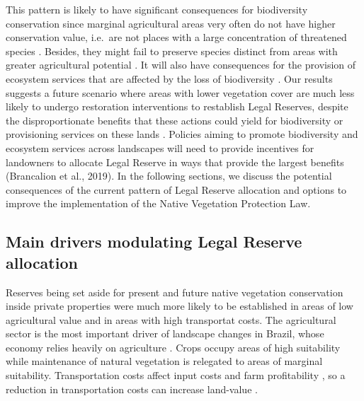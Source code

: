 \documentclass[
	12pt,				%
	oneside,			%
	a4paper,			%
	chapter=TITLE,		%
	section=TITLE,		%
	brazil,			%
	english				%
	]{abntex2}
\begin{document}
This pattern is likely to have significant consequences for biodiversity conservation since marginal agricultural areas very often do not have higher conservation value, i.e.~are not places with a large concentration of threatened species \autocite{venter_bias_2018}. Besides, they might fail to preserve species distinct from areas with greater agricultural potential \autocite{rouget_current_2003}. It will also have consequences for the provision of ecosystem services that are affected by the loss of biodiversity \autocite{tscharntke_landscape_2012}. Our results suggests a future scenario where areas with lower vegetation cover are much less likely to undergo restoration interventions to restablish Legal Reserves, despite the disproportionate benefits that these actions could yield for biodiversity or provisioning services on these lands \autocite{dainese_global_2019}. Policies aiming to promote biodiversity and ecosystem services across landscapes will need to provide incentives for landowners to allocate Legal Reserve in ways that provide the largest benefits (Brancalion et al., 2019). In the following sections, we discuss the potential consequences of the current pattern of Legal Reserve allocation and options to improve the implementation of the Native Vegetation Protection Law.

\hypertarget{main-drivers-modulating-legal-reserve-allocation}{%
\subsection{Main drivers modulating Legal Reserve allocation}\label{main-drivers-modulating-legal-reserve-allocation}}

Reserves being set aside for present and future native vegetation conservation inside private properties were much more likely to be established in areas of low agricultural value and in areas with high transportat costs. The agricultural sector is the most important driver of landscape changes in Brazil, whose economy relies heavily on agriculture \autocite{calaboni_forest_2018,martinelli_agriculture_2010}. Crops occupy areas of high suitability while maintenance of natural vegetation is relegated to areas of marginal suitability. Transportation costs affect input costs and farm profitability \autocite{fliehr_impacts_2019,tamm_impact_2010}, so a reduction in transportation costs can increase land-value \autocite{miranda_land_2019}.
\end{document}
